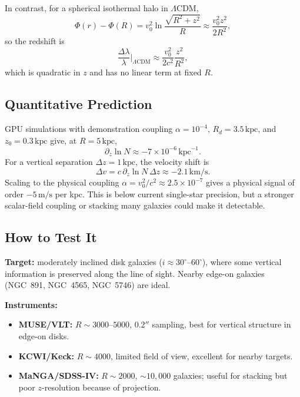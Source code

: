\documentclass[11pt,a4paper]{article}
\theoremstyle{definition}
\begin{document}
In contrast, for a spherical isothermal halo in $\Lambda$CDM,
\begin{equation}
    \Phi(r)-\Phi(R) = v_0^2\ln\!\frac{\sqrt{R^2+z^2}}{R} \approx \frac{v_0^2 z^2}{2R^2},
\end{equation}
so the redshift is
\begin{equation}
    \frac{\Delta\lambda}{\lambda}\bigg|_{\Lambda\mathrm{CDM}} \approx \frac{v_0^2}{2c^2}\frac{z^2}{R^2},
\end{equation}
which is quadratic in $z$ and has no linear term at fixed $R$.

\subsection{Quantitative Prediction}

GPU simulations with demonstration coupling $\alpha=10^{-4}$, $R_d=3.5\,\mathrm{kpc}$, and $z_0=0.3\,\mathrm{kpc}$ give, at $R=5\,\mathrm{kpc}$,
\begin{equation}
    \partial_z\ln N \approx -7\times 10^{-6}\,\mathrm{kpc}^{-1}.
\end{equation}
For a vertical separation $\Delta z=1\,\mathrm{kpc}$, the velocity shift is
\begin{equation}
    \Delta v = c\,\partial_z\ln N\,\Delta z \approx -2.1\,\mathrm{km/s}.
\end{equation}
Scaling to the physical coupling $\alpha=v_0^2/c^2\approx 2.5\times 10^{-7}$ gives a physical signal of order $-5\,\mathrm{m/s}$ per kpc. This is below current single-star precision, but a stronger scalar-field coupling or stacking many galaxies could make it detectable.

\subsection{How to Test It}

\textbf{Target:} moderately inclined disk galaxies ($i\approx 30^\circ$--$60^\circ$), where some vertical information is preserved along the line of sight. Nearby edge-on galaxies (NGC~891, NGC~4565, NGC~5746) are ideal.

\textbf{Instruments:}
\begin{itemize}
    \item \textbf{MUSE/VLT:} $R\sim 3000$--$5000$, $0.2''$ sampling, best for vertical structure in edge-on disks.
    \item \textbf{KCWI/Keck:} $R\sim 4000$, limited field of view, excellent for nearby targets.
    \item \textbf{MaNGA/SDSS-IV:} $R\sim 2000$, $\sim 10{,}000$ galaxies; useful for stacking but poor $z$-resolution because of projection.
\end{itemize}
\end{document}
